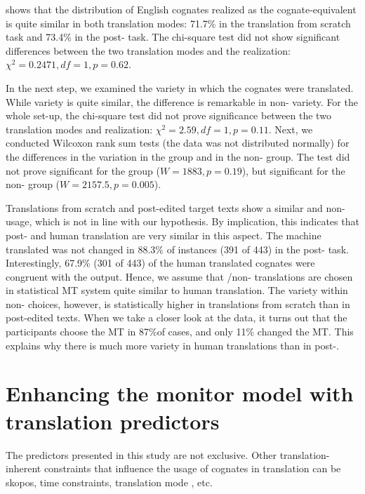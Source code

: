 \documentclass[output=paper]{LSP/langsci}
\begin{document}
 shows that the distribution of English cognates realized as the  cognate-equivalent is quite similar in both translation modes: 71.7\% in the translation from scratch task and 73.4\% in the post- task. The chi-square test did not show significant differences between the two translation modes and the  realization: $\chi^{2} = 0.2471, df = 1, p = 0.62$.

In the next step, we examined the variety in which the cognates were translated. While  variety is quite similar, the difference is remarkable in non- variety. For the whole set-up, the chi-square test did not prove significance between the two translation modes and  realization: $\chi^{2}=2.59, df=1, p=0.11$. Next, we conducted Wilcoxon rank sum tests (the data was not distributed normally) for the differences in the variation in the  group and in the non- group. The test did not prove significant for the  group ($W=1883, p=0.19$), but significant for the non- group ($W=2157.5, p=0.005$).

Translations from scratch and post-edited target texts show a similar  and non- usage, which is not in line with our hypothesis. By implication, this indicates that post- and human translation are very similar in this aspect. The machine translated  was not changed in 88.3\% of instances (391 of 443) in the post- task. Interestingly, 67.9\% (301 of 443) of the human translated cognates were congruent with the  output. Hence, we assume that /non- translations are chosen in statistical MT system quite similar to human translation. The variety within non- choices, however, is statistically higher in translations from scratch than in post-edited texts. When we take a closer look at the data, it turns out that the participants choose the MT in 87\%of cases, and only 11\% changed the MT. This explains why there is much more variety in human translations than in post-.

\section{Enhancing the monitor model with translation predictors}\label{hansenschirraetal:sec:5}
The predictors presented in this study are not exclusive. Other translation-in\-her\-ent constraints that influence the usage of cognates in translation can be skopos, time constraints, translation mode , etc.
\end{document}
